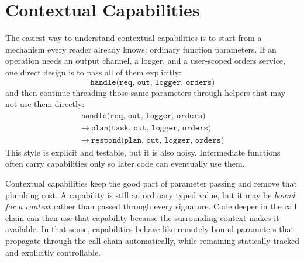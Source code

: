 
\section{Contextual Capabilities}
\label{sec:background}

The easiest way to understand contextual capabilities is to start from a
mechanism every reader already knows: ordinary function parameters. %
If an operation needs an output channel, a logger, and a user-scoped orders
service, one direct design is to pass all of them explicitly:
\[
\texttt{handle(req, out, logger, orders)}
\]
and then continue threading those same parameters through helpers that may not
use them directly:
\[
\begin{array}{l}
\texttt{handle(req, out, logger, orders)} \\
\rightarrow\ \texttt{plan(task, out, logger, orders)} \\
\rightarrow\ \texttt{respond(plan, out, logger, orders)}
\end{array}
\]
This style is explicit and testable, but it is also noisy. %
Intermediate functions often carry capabilities only so later code can
eventually use them. %

Contextual capabilities keep the good part of parameter passing and remove that
plumbing cost. %
A capability is still an ordinary typed value, but it may be \emph{bound for a
  context} rather than passed through every signature. %
Code deeper in the call chain can then use that capability because the
surrounding context makes it available. %
In that sense, capabilities behave like remotely bound parameters that propagate
through the call chain automatically, while remaining statically tracked and
explicitly controllable. %

